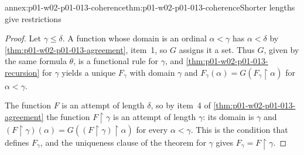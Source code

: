 \begin{annexitem}{annex:p01-w02-p01-013-coherence}{thm:p01-w02-p01-013-coherence}{Shorter lengths give restrictions}
\begin{proof}
Let \(\gamma\leq\delta\). A function whose domain is an ordinal
\(\alpha<\gamma\) has \(\alpha<\delta\) by
\cref{thm:p01-w02-p01-013-agreement}, item~1, so \(G\) assigns it a set. Thus
\(G\), given by the same formula \(\theta\), is a functional rule for
\(\gamma\), and \cref{thm:p01-w02-p01-013-recursion} for \(\gamma\) yields a
unique \(F_\gamma\) with domain \(\gamma\) and
\(F_\gamma(\alpha)=G(F_\gamma\mathbin{\upharpoonright}\alpha)\) for
\(\alpha<\gamma\).

The function \(F\) is an attempt of length \(\delta\), so by item~4 of
\cref{thm:p01-w02-p01-013-agreement} the function
\(F\mathbin{\upharpoonright}\gamma\) is an attempt of length \(\gamma\): its
domain is \(\gamma\) and
\((F\mathbin{\upharpoonright}\gamma)(\alpha)
=G((F\mathbin{\upharpoonright}\gamma)\mathbin{\upharpoonright}\alpha)\) for
every \(\alpha<\gamma\). This is the condition that defines \(F_\gamma\), and
the uniqueness clause of the theorem for \(\gamma\) gives
\(F_\gamma=F\mathbin{\upharpoonright}\gamma\).
\end{proof}
\end{annexitem}

